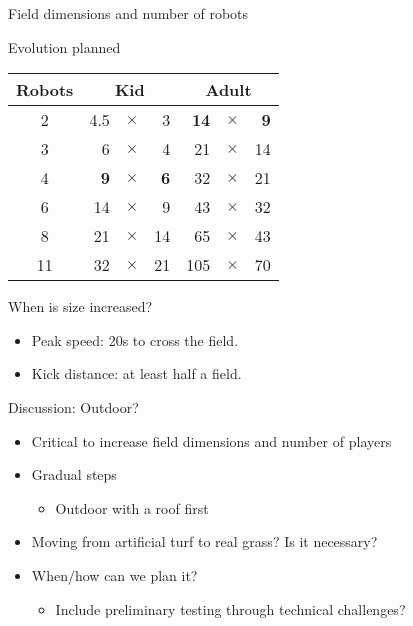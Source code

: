 \documentclass[xcolor=dvipsnames]{beamer}
\begin{document}
\begin{frame}{Field dimensions and number of robots}
  \begin{block}{Evolution planned}
    \centering
    \begin{tabular}{c|r c r|r c r}
      \textbf{Robots} & \multicolumn{3}{c}{\textbf{Kid}} & \multicolumn{3}{c}{\textbf{Adult}}\\
      \hline
      2 & 4.5 & $\times$ & 3 & \textbf{14} & $\times$ & \textbf{9}\\
      3 & 6 & $\times$ & 4 & 21 & $\times$ & 14\\   
      4 & \textbf{9} & $\times$ & \textbf{6} & 32 & $\times$ & 21\\
      6 & 14 & $\times$ & 9 & 43 & $\times$ & 32\\
      8 & 21 & $\times$ & 14 & 65 & $\times$ & 43\\
      11 & 32 & $\times$ & 21 & 105 & $\times$ & 70
    \end{tabular}
  \end{block}
  \begin{block}{When is size increased?}
    \begin{itemize}
    \item Peak speed: 20s to cross the field.
    \item Kick distance: at least half a field.
    \end{itemize}
  \end{block}
\end{frame}

\begin{frame}{Discussion: Outdoor?}
  \begin{itemize}
  \item Critical to increase field dimensions and number of players
  \item Gradual steps
    \begin{itemize}
    \item Outdoor with a roof first
    \end{itemize}
  \item Moving from artificial turf to real grass? Is it necessary?
  \item When/how can we plan it? 
    \begin{itemize}
    \item Include preliminary testing through technical challenges?
    \end{itemize}
  \end{itemize}
\end{frame}
\end{document}
